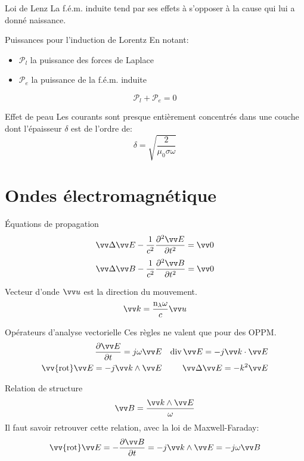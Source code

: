 \documentclass[french, a4paper, 11pt, twocolumn]{article}
\DeclareMathOperator{\diverg}{div}        %
\newcommand{\rota}{\vv{\mathrm{rot}}}    %
\begin{document}
\begin{cadre}{Loi de Lenz}
  \og La f.é.m. induite tend par ses effets à s'opposer à la cause qui lui a donné naissance.\fg{}
\end{cadre}

\begin{cadre}{Puissances pour l'induction de Lorentz}
  En notant:
  \begin{itemize}
    \item \(\mathcal{P}_{l}\) la puissance des forces de Laplace
    \item \(\mathcal{P}_{e}\) la puissance de la f.é.m. induite
  \end{itemize}
  \[\mathcal{P}_{l}+\mathcal{P}_{e} = 0\]
\end{cadre}

\begin{cadre}{Effet de peau}
  Les courants sont presque entièrement concentrés dans une couche dont l'épaisseur \(\delta\) est de l'ordre de:
  \[\delta = \sqrt{\dfrac{2}{\mu_{0}\sigma\omega}}\]
\end{cadre}

\section{Ondes électromagnétique}
\begin{cadre}{Équations de propagation}
  \[\vv\Delta \vv E - \dfrac{1}{c^{2}}\dfrac{\partial^{2}\vv E}{\partial t^{2}} = \vv 0\]
  \[\vv\Delta \vv B - \dfrac{1}{c^{2}}\dfrac{\partial^{2}\vv B}{\partial t^{2}} = \vv 0\]
\end{cadre}

\begin{cadre}{Vecteur d'onde}
  \(\vv u\) est la direction du mouvement.
  \[\vv k = \dfrac{\mathrm{n}_{\lambda}\omega}{c}\vv u\]
\end{cadre}

\begin{cadre}{Opérateurs d'analyse vectorielle}
  Ces règles ne valent que pour des OPPM.
  \begin{align*}
    \dfrac{\partial\vv E}{\partial t} = j\omega\vv E && \diverg\vv E = -j\vv k\cdot\vv E \\
    \rota\vv E = -j\vv k\wedge\vv E && \vv\Delta\vv E = -k^{2}\vv E
  \end{align*}
\end{cadre}

\begin{cadre}{Relation de structure}
  \[\vv B=\dfrac{\vv k\wedge\vv E}{\omega}\]
  Il faut savoir retrouver cette relation, avec la loi de Maxwell-Faraday:
  \[\rota\vv E = -\dfrac{\partial\vv B}{\partial t} = -j\vv k\wedge\vv E = -j\omega\vv B\]
\end{cadre}
\end{document}
